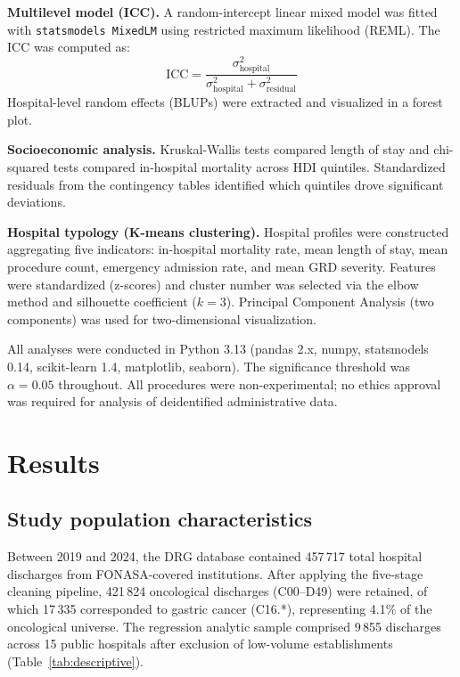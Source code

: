 \documentclass[10pt,twocolumn]{article}
\begin{document}
\textbf{Multilevel model (ICC).} A random-intercept linear mixed model was fitted
with \texttt{statsmodels MixedLM} using restricted maximum likelihood (REML).
The ICC was computed as:
\begin{equation*}
  \text{ICC} = \frac{\sigma^2_{\text{hospital}}}{\sigma^2_{\text{hospital}} +
  \sigma^2_{\text{residual}}}
\end{equation*}
Hospital-level random effects (BLUPs) were extracted and visualized in a forest plot.

\textbf{Socioeconomic analysis.} Kruskal-Wallis tests compared length of stay and
chi-squared tests compared in-hospital mortality across HDI quintiles. Standardized
residuals from the contingency tables identified which quintiles drove significant
deviations.

\textbf{Hospital typology (K-means clustering).} Hospital profiles were constructed
aggregating five indicators: in-hospital mortality rate, mean length of stay,
mean procedure count, emergency admission rate, and mean GRD severity. Features
were standardized (z-scores) and cluster number was selected via the elbow method
and silhouette coefficient ($k = 3$). Principal Component Analysis (two components)
was used for two-dimensional visualization.

All analyses were conducted in Python 3.13 (pandas 2.x, numpy, statsmodels 0.14,
scikit-learn 1.4, matplotlib, seaborn). The significance threshold was
$\alpha = 0{.}05$ throughout. All procedures were non-experimental; no ethics
approval was required for analysis of deidentified administrative data.

\section{Results}

\subsection{Study population characteristics}

Between 2019 and 2024, the DRG database contained 457\,717 total hospital
discharges from FONASA-covered institutions. After applying the five-stage cleaning
pipeline, 421\,824 oncological discharges (C00–D49) were retained, of which
17\,335 corresponded to gastric cancer (C16.*), representing 4.1\% of the
oncological universe. The regression analytic sample comprised 9\,855 discharges
across 15 public hospitals after exclusion of low-volume establishments
(Table~\ref{tab:descriptive}).
\end{document}
